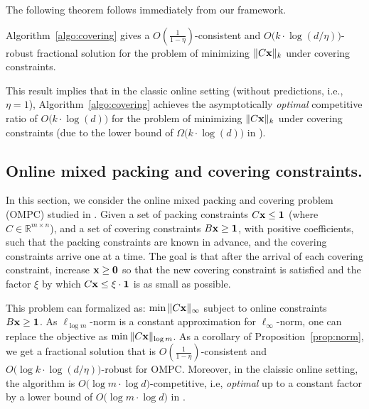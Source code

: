 The following theorem follows immediately from our framework.

\begin{proposition}	\label{prop:norm}
Algorithm~\ref{algo:covering} gives a
$O(\frac{1}{1 - \eta})$-consistent and $O\bigl( k \cdot \log (d/\eta)\bigr)$-robust fractional solution
for the problem of minimizing $\|C \mathbf{x}\|_{k}$ under covering constraints.
\end{proposition}

This result implies that in the classic online setting (without predictions, i.e., $\eta = 1$), Algorithm~\ref{algo:covering}
achieves the asymptotically \emph{optimal} competitive ratio of  $O\bigl( k \cdot \log (d)\bigr)$
for the problem of minimizing $\|C \mathbf{x}\|_{k}$ under covering constraints (due to the lower bound
of $\Omega\bigl( k \cdot \log (d)\bigr)$ in \cite{AzarCohen14:Online-Covering}).

\subsection{Online mixed packing and covering constraints.}
In this section, we consider the online mixed packing and covering problem (OMPC) studied in \cite{AzarBhaskar13:Online-mixed}.
Given a set of packing constraints $C \mathbf{x} \leq \mathbf{1}$ (where $C \in \mathbb{R}^{m \times n}$),
and a set of covering constraints $B \mathbf{x} \geq \mathbf{1}$, with positive coefficients,
such that the packing constraints are known in advance, and the covering constraints arrive one at a time.
The goal is that after the arrival of each
covering constraint, increase $\mathbf{x} \geq \mathbf{0}$ so that the new covering constraint is satisfied and the factor $\xi$
by which $C \mathbf{x} \leq \xi \cdot \mathbf{1}$ is as small as possible.

This problem can formalized as: $\min \| C \mathbf{x}\|_{\infty}$ subject to online constraints $B \mathbf{x} \geq \mathbf{1}$.
As $\ell_{\log m}$-norm is a constant approximation for $\ell_{\infty}$-norm, one can replace the objective as $\min \| C \mathbf{x}\|_{\log m}$.
As a corollary of Proposition~\ref{prop:norm}, we get a fractional solution that is
$O(\frac{1}{1 - \eta})$-consistent and $O\bigl( \log k \cdot \log (d/\eta)\bigr)$-robust for OMPC.
Moreover, in the claissic online setting, the algorithm is $O\bigl( \log m \cdot \log d \bigr)$-competitive, i.e, \emph{optimal} up to a constant factor
by a lower bound of $O\bigl( \log m \cdot \log d \bigr)$ in \cite{AzarBhaskar13:Online-mixed}.
